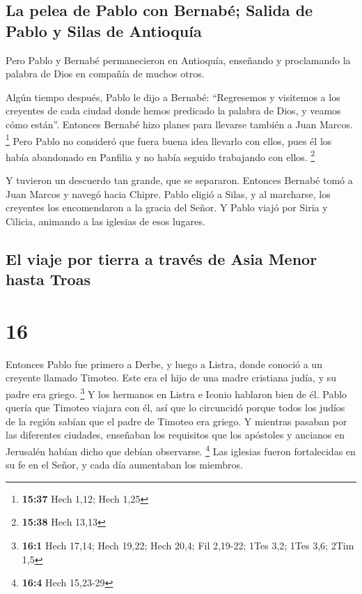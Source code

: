 \hypertarget{la-pelea-de-pablo-con-bernabuxe9-salida-de-pablo-y-silas-de-antioquuxeda}{%
\subsection{La pelea de Pablo con Bernabé; Salida de Pablo y Silas de
Antioquía}\label{la-pelea-de-pablo-con-bernabuxe9-salida-de-pablo-y-silas-de-antioquuxeda}}

 Pero Pablo y Bernabé permanecieron en Antioquía,
enseñando y proclamando la palabra de Dios en compañía de muchos otros.

 Algún tiempo después, Pablo le dijo a Bernabé:
``Regresemos y visitemos a los creyentes de cada ciudad donde hemos
predicado la palabra de Dios, y veamos cómo están''. 
Entonces Bernabé hizo planes para llevarse también a Juan Marcos.
\footnote{\textbf{15:37} Hech 1,12; Hech 1,25}  Pero
Pablo no consideró que fuera buena idea llevarlo con ellos, pues él los
había abandonado en Panfilia y no había seguido trabajando con ellos.
\footnote{\textbf{15:38} Hech 13,13}

 Y tuvieron un descuerdo tan grande, que se separaron.
Entonces Bernabé tomó a Juan Marcos y navegó hacia Chipre.
 Pablo eligió a Silas, y al marcharse, los creyentes los
encomendaron a la gracia del Señor.  Y Pablo viajó por
Siria y Cilicia, animando a las iglesias de esos lugares.

\hypertarget{el-viaje-por-tierra-a-travuxe9s-de-asia-menor-hasta-troas}{%
\subsection{El viaje por tierra a través de Asia Menor hasta
Troas}\label{el-viaje-por-tierra-a-travuxe9s-de-asia-menor-hasta-troas}}

\hypertarget{section-15}{%
\section{16}\label{section-15}}

 Entonces Pablo fue primero a Derbe, y luego a Listra,
donde conoció a un creyente llamado Timoteo. Este era el hijo de una
madre cristiana judía, y su padre era griego. \footnote{\textbf{16:1}
  Hech 17,14; Hech 19,22; Hech 20,4; Fil 2,19-22; 1Tes 3,2; 1Tes 3,6;
  2Tim 1,5}  Y los hermanos en Listra e Iconio hablaron
bien de él.  Pablo quería que Timoteo viajara con él, así
que lo circuncidó porque todos los judíos de la región sabían que el
padre de Timoteo era griego.  Y mientras pasaban por las
diferentes ciudades, enseñaban los requisitos que los apóstoles y
ancianos en Jerusalén habían dicho que debían observarse. \footnote{\textbf{16:4}
  Hech 15,23-29}  Las iglesias fueron fortalecidas en su
fe en el Señor, y cada día aumentaban los miembros.

